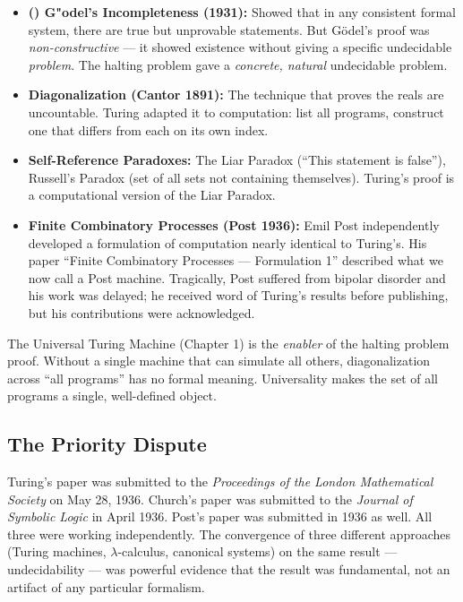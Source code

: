 \begin{itemize}
\item \textbf{(\cite{godel1931}) G{"o}del's Incompleteness (1931):} Showed that in any consistent formal system, there are true but unprovable statements. But G\"odel's proof was \emph{non-constructive} — it showed existence without giving a specific undecidable \emph{problem}. The halting problem gave a \emph{concrete, natural} undecidable problem.

\item \textbf{Diagonalization (Cantor 1891):} The technique that proves the reals are uncountable. Turing adapted it to computation: list all programs, construct one that differs from each on its own index.

\item \textbf{Self-Reference Paradoxes:} The Liar Paradox (``This statement is false''), Russell's Paradox (set of all sets not containing themselves). Turing's proof is a computational version of the Liar Paradox.

\item \textbf{Finite Combinatory Processes (Post 1936):} Emil Post independently developed a formulation of computation nearly identical to Turing's. His paper ``Finite Combinatory Processes — Formulation 1'' described what we now call a Post machine. Tragically, Post suffered from bipolar disorder and his work was delayed; he received word of Turing's results before publishing, but his contributions were acknowledged.
\end{itemize}

The Universal Turing Machine (Chapter 1) is the \emph{enabler} of the halting problem proof. Without a single machine that can simulate all others, diagonalization across ``all programs'' has no formal meaning. Universality makes the set of all programs a single, well-defined object.

\subsection*{The Priority Dispute}

Turing's paper was submitted to the \emph{Proceedings of the London Mathematical Society} on May 28, 1936. Church's paper was submitted to the \emph{Journal of Symbolic Logic} in April 1936. Post's paper was submitted in 1936 as well. All three were working independently. The convergence of three different approaches (Turing machines, $\lambda$-calculus, canonical systems) on the same result — undecidability — was powerful evidence that the result was fundamental, not an artifact of any particular formalism.

